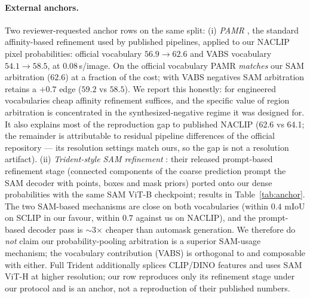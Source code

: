 \documentclass[11pt]{article}
\newcommand{\miou}{mIoU}
\begin{document}
\paragraph{External anchors.} Two reviewer-requested anchor rows on the same split:
(i) \emph{PAMR} \citep{araslanov2020}, the standard affinity-based refinement used by
published pipelines, applied to our NACLIP pixel probabilities: official vocabulary
$56.9\rightarrow62.6$ and VABS vocabulary $54.1\rightarrow58.5$, at $0.08$\,s/image.
On the official vocabulary PAMR \emph{matches} our SAM arbitration ($62.6$) at a
fraction of the cost; with VABS negatives SAM arbitration retains a $+0.7$ edge
($59.2$ vs $58.5$). We report this honestly: for engineered vocabularies cheap
affinity refinement suffices, and the specific value of region arbitration is
concentrated in the synthesized-negative regime it was designed for. It also
explains most of the reproduction gap to published NACLIP (62.6 vs 64.1; the
remainder is attributable to residual pipeline differences of the official
repository --- its resolution settings match ours, so the gap is not a
resolution artifact). (ii) \emph{Trident-style SAM refinement}
\citep{shi2025trident}: their released prompt-based refinement stage (connected
components of the coarse prediction prompt the SAM decoder with points, boxes and
mask priors) ported onto our dense probabilities with the same SAM ViT-B checkpoint;
results in Table~\ref{tab:anchor}. The two SAM-based mechanisms are close on both
vocabularies (within $0.4$ \miou{} on SCLIP in our favour, within $0.7$ against us on
NACLIP), and the prompt-based decoder pass is $\sim$3$\times$ cheaper than automask
generation. We therefore do \emph{not} claim our probability-pooling arbitration is a
superior SAM-usage mechanism; the vocabulary contribution (VABS) is orthogonal to and
composable with either. Full Trident additionally splices CLIP/DINO features and uses
SAM ViT-H at higher resolution; our row reproduces only its refinement stage under our
protocol and is an anchor, not a reproduction of their published numbers.
\end{document}
